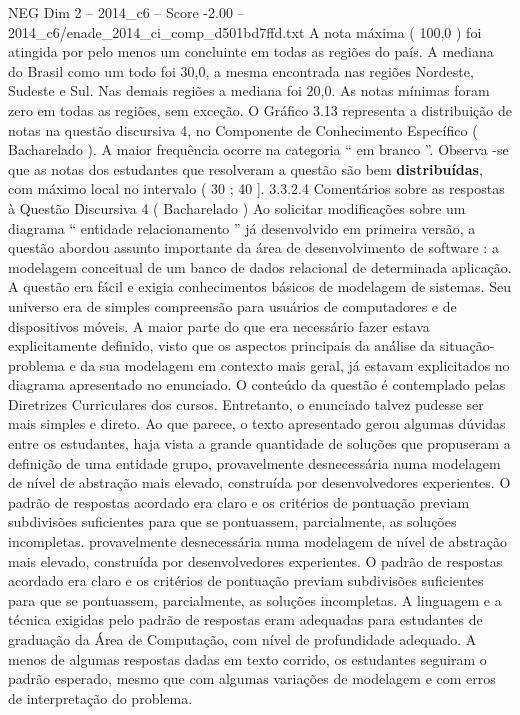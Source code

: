 \begin{textsample}{NEG Dim 2 – 2014\_c6 – Score -2.00 – 2014\_c6/enade\_2014\_ci\_comp\_d501bd7ffd.txt}
A nota máxima ( 100,0 ) foi atingida por pelo menos um concluinte em todas as regiões do país.
A mediana do Brasil como um todo foi 30,0, a mesma encontrada nas regiões Nordeste, Sudeste e Sul.
Nas demais regiões a mediana foi 20,0.
As notas mínimas foram zero em todas as regiões, sem exceção.
O Gráfico 3.13 representa a distribuição de notas na questão discursiva 4, no Componente de Conhecimento Específico ( Bacharelado ).
A maior frequência ocorre na categoria “ em branco ”.
Observa -se que as notas dos estudantes que resolveram a questão são bem \textbf{distribuídas}, com máximo local no intervalo ( 30 ; 40 ]. 3.3.2.4 Comentários sobre as respostas à Questão Discursiva 4 ( Bacharelado ) Ao solicitar modificações sobre um diagrama “ entidade relacionamento ” já desenvolvido em primeira versão, a questão abordou assunto importante da área de desenvolvimento de software : a modelagem conceitual de um banco de dados relacional de determinada aplicação.
A questão era fácil e exigia conhecimentos básicos de modelagem de sistemas.
Seu universo era de simples compreensão para usuários de computadores e de dispositivos móveis.
A maior parte do que era necessário fazer estava explicitamente definido, visto que os aspectos principais da análise da situação-problema e da sua modelagem em contexto mais geral, já estavam explicitados no diagrama apresentado no enunciado.
O conteúdo da questão é contemplado pelas Diretrizes Curriculares dos cursos.
Entretanto, o enunciado talvez pudesse ser mais simples e direto.
Ao que parece, o texto apresentado gerou algumas dúvidas entre os estudantes, haja vista a grande quantidade de soluções que propuseram a definição de uma entidade grupo, provavelmente desnecessária numa modelagem de nível de abstração mais elevado, construída por desenvolvedores experientes.
O padrão de respostas acordado era claro e os critérios de pontuação previam subdivisões suficientes para que se pontuassem, parcialmente, as soluções incompletas. provavelmente desnecessária numa modelagem de nível de abstração mais elevado, construída por desenvolvedores experientes.
O padrão de respostas acordado era claro e os critérios de pontuação previam subdivisões suficientes para que se pontuassem, parcialmente, as soluções incompletas.
A linguagem e a técnica exigidas pelo padrão de respostas eram adequadas para estudantes de graduação da Área de Computação, com nível de profundidade adequado.
A menos de algumas respostas dadas em texto corrido, os estudantes seguiram o padrão esperado, mesmo que com algumas variações de modelagem e com erros de interpretação do problema.

\end{textsample}
